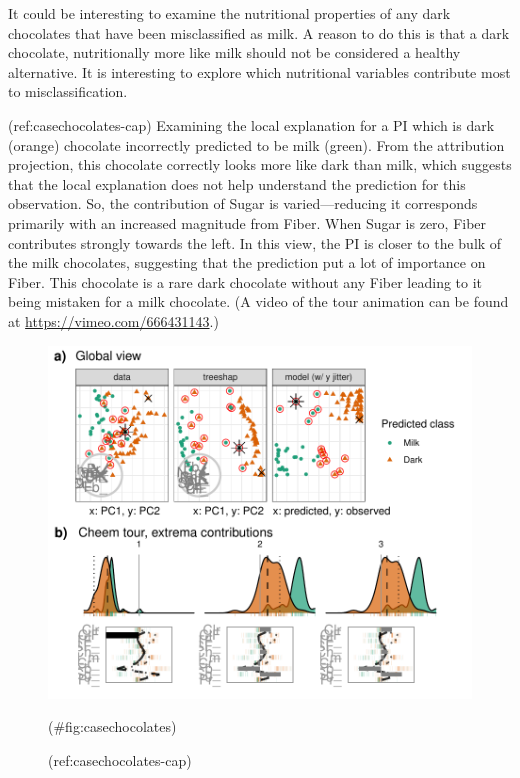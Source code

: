 \documentclass[
]{jss}
\begin{document}
It could be interesting to examine the nutritional properties of any dark chocolates that have been misclassified as milk. A reason to do this is that a dark chocolate, nutritionally more like milk should not be considered a healthy alternative. It is interesting to explore which nutritional variables contribute most to misclassification.

(ref:casechocolates-cap) Examining the local explanation for a PI which is dark (orange) chocolate incorrectly predicted to be milk (green). From the attribution projection, this chocolate correctly looks more like dark than milk, which suggests that the local explanation does not help understand the prediction for this observation. So, the contribution of Sugar is varied---reducing it corresponds primarily with an increased magnitude from Fiber. When Sugar is zero, Fiber contributes strongly towards the left. In this view, the PI is closer to the bulk of the milk chocolates, suggesting that the prediction put a lot of importance on Fiber. This chocolate is a rare dark chocolate without any Fiber leading to it being mistaken for a milk chocolate. (A video of the tour animation can be found at \url{https://vimeo.com/666431143}.)

\begin{CodeChunk}
\begin{figure}

{\centering \includegraphics[width=1\linewidth]{./figures/case_chocolates} 

}

\caption[(ref:casechocolates-cap)]{(ref:casechocolates-cap)}(\#fig:casechocolates)
\end{figure}
\end{CodeChunk}
\end{document}
